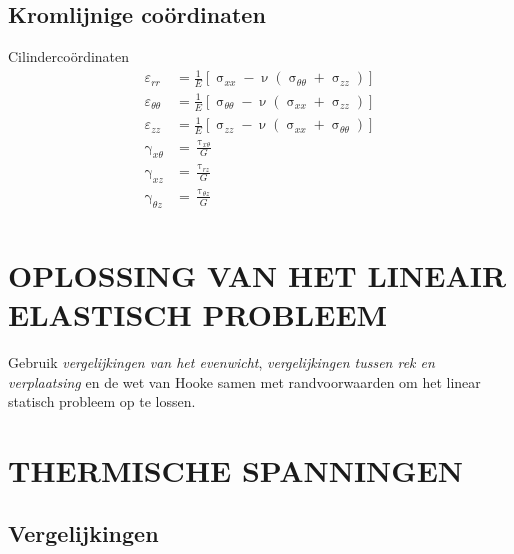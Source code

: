         \subsection{Kromlijnige coördinaten}
            
            Cilindercoördinaten
            \begin{align}
                \varepsilon_{rr} &= \frac{1}{E}\left[\upsigma_{xx} - \upnu\left(\upsigma_{\theta\theta}+\upsigma_{zz}\right)\right]\nonumber\\
                \varepsilon_{\theta\theta} &= \frac{1}{E}\left[\upsigma_{\theta\theta} - \upnu\left(\upsigma_{xx}+\upsigma_{zz}\right)\right]\nonumber\\
                \varepsilon_{zz} &= \frac{1}{E}\left[\upsigma_{zz} - \upnu\left(\upsigma_{xx}+\upsigma_{\theta\theta}\right)\right]\nonumber\\
                \upgamma_{x\theta} &= \frac{\uptau_{x\theta}}{G}\nonumber\\
                \upgamma_{xz} &= \frac{\uptau_{rz}}{G}\nonumber\\
                \upgamma_{\theta z} &= \frac{\uptau_{\theta z}}{G}\nonumber\\
            \end{align}

    \section{OPLOSSING VAN HET LINEAIR ELASTISCH PROBLEEM}

        Gebruik \emph{vergelijkingen van het evenwicht}, \emph{vergelijkingen tussen rek en verplaatsing} en de wet van Hooke samen met randvoorwaarden om het linear statisch probleem op te lossen.

    \section{THERMISCHE SPANNINGEN}

        \subsection{Vergelijkingen}

